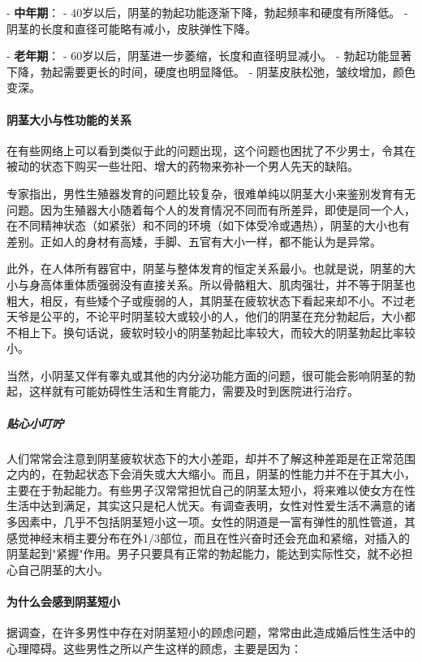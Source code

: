 \begin{enumerate}
- \textbf{中年期}：
  - 40岁以后，阴茎的勃起功能逐渐下降，勃起频率和硬度有所降低。
  - 阴茎的长度和直径可能略有减小，皮肤弹性下降。

- \textbf{老年期}：
  - 60岁以后，阴茎进一步萎缩，长度和直径明显减小。
  - 勃起功能显著下降，勃起需要更长的时间，硬度也明显降低。
  - 阴茎皮肤松弛，皱纹增加，颜色变深。

\paragraph{阴茎大小与性功能的关系}

在有些网络上可以看到类似于此的问题出现，这个问题也困扰了不少男士，令其在被动的状态下购买一些壮阳、增大的药物来弥补一个男人先天的缺陷。

专家指出，男性生殖器发育的问题比较复杂，很难单纯以阴茎大小来鉴别发育有无问题。因为生殖器大小随着每个人的发育情况不同而有所差异，即使是同一个人，在不同精神状态（如紧张）和不同的环境（如下体受冷或遇热），阴茎的大小也有差别。正如人的身材有高矮，手脚、五官有大小一样，都不能认为是异常。

此外，在人体所有器官中，阴茎与整体发育的恒定关系最小。也就是说，阴茎的大小与身高体重体质强弱没有直接关系。所以骨骼粗大、肌肉强壮，并不等于阴茎也粗大，相反，有些矮个子或瘦弱的人，其阴茎在疲软状态下看起来却不小。不过老天爷是公平的，不论平时阴茎较大或较小的人，他们的阴茎在充分勃起后，大小都不相上下。换句话说，疲软时较小的阴茎勃起比率较大，而较大的阴茎勃起比率较小。

当然，小阴茎又伴有睾丸或其他的内分泌功能方面的问题，很可能会影响阴茎的勃起，这样就有可能妨碍性生活和生育能力，需要及时到医院进行治疗。

\subparagraph{贴心小叮咛}

人们常常会注意到阴茎疲软状态下的大小差距，却并不了解这种差距是在正常范围之内的，在勃起状态下会消失或大大缩小。而且，阴茎的性能力并不在于其大小，主要在于勃起能力。有些男子汉常常担忧自己的阴茎太短小，将来难以使女方在性生活中达到满足，其实这只是杞人忧天。有调查表明，女性对性爱生活不满意的诸多因素中，几乎不包括阴茎短小这一项。女性的阴道是一富有弹性的肌性管道，其感觉神经末梢主要分布在外1/3部位，而且在性兴奋时还会充血和紧缩，对插入的阴茎起到"紧握"作用。男子只要具有正常的勃起能力，能达到实际性交，就不必担心自己阴茎的大小。

\paragraph{为什么会感到阴茎短小}

据调查，在许多男性中存在对阴茎短小的顾虑问题，常常由此造成婚后性生活中的心理障碍。这些男性之所以产生这样的顾虑，主要是因为：


\end{enumerate}

